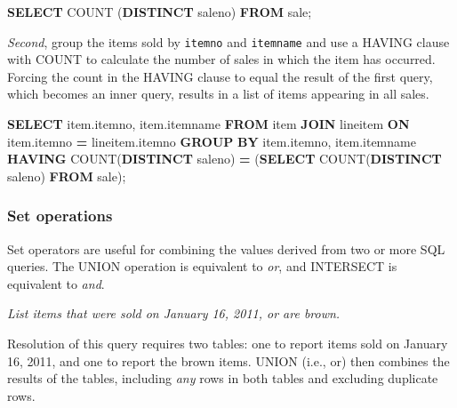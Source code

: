 \documentclass[
]{article}
\newenvironment{Shaded}{\begin{snugshade}}{\end{snugshade}}
\newcommand{\FunctionTok}[1]{\textcolor[rgb]{0.00,0.00,0.00}{#1}}
\newcommand{\KeywordTok}[1]{\textcolor[rgb]{0.13,0.29,0.53}{\textbf{#1}}}
\newcommand{\NormalTok}[1]{#1}
\newcommand{\OperatorTok}[1]{\textcolor[rgb]{0.81,0.36,0.00}{\textbf{#1}}}
\begin{document}
\begin{Shaded}
\begin{Highlighting}[]
\KeywordTok{SELECT} \FunctionTok{COUNT}\NormalTok{ (}\KeywordTok{DISTINCT}\NormalTok{ saleno) }\KeywordTok{FROM}\NormalTok{ sale;}
\end{Highlighting}
\end{Shaded}

\emph{Second}, group the items sold by \texttt{itemno} and \texttt{itemname} and use a HAVING clause with COUNT to calculate the number of sales in which the item has occurred. Forcing the count in the HAVING clause to equal the result of the first query, which becomes an inner query, results in a list of items appearing in all sales.

\begin{Shaded}
\begin{Highlighting}[]
\KeywordTok{SELECT}\NormalTok{ item.itemno, item.itemname}
    \KeywordTok{FROM}\NormalTok{ item }\KeywordTok{JOIN}\NormalTok{ lineitem}
        \KeywordTok{ON}\NormalTok{ item.itemno }\OperatorTok{=}\NormalTok{ lineitem.itemno}
            \KeywordTok{GROUP} \KeywordTok{BY}\NormalTok{ item.itemno, item.itemname}
                \KeywordTok{HAVING} \FunctionTok{COUNT}\NormalTok{(}\KeywordTok{DISTINCT}\NormalTok{ saleno)}
                    \OperatorTok{=}\NormalTok{ (}\KeywordTok{SELECT} \FunctionTok{COUNT}\NormalTok{(}\KeywordTok{DISTINCT}\NormalTok{ saleno) }\KeywordTok{FROM}\NormalTok{ sale);}
\end{Highlighting}
\end{Shaded}

\hypertarget{set-operations}{%
\subsubsection*{Set operations}\label{set-operations}}

Set operators are useful for combining the values derived from two or more SQL queries. The UNION operation is equivalent to \emph{or}, and INTERSECT is equivalent to \emph{and}.

\emph{List items that were sold on January 16, 2011, or are brown.}

Resolution of this query requires two tables: one to report items sold on January 16, 2011, and one to report the brown items. UNION (i.e., or) then combines the results of the tables, including \emph{any} rows in both tables and excluding duplicate rows.
\end{document}
